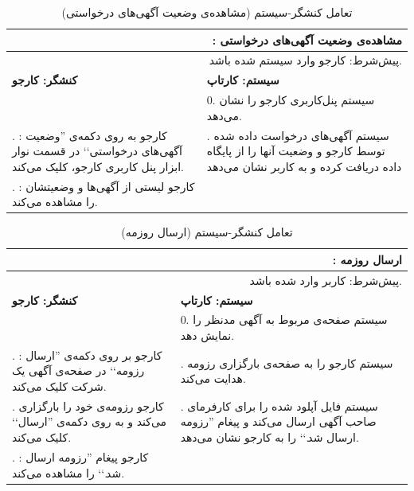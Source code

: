 \documentclass[12pt,svgnames,oneside]{book}
\newcommand{\say}[1]{‍''{#1}`‍`}
\newcommand{\uc}[1]{\lr{UC{#1}}}
\newcommand{\tucbw}{\lr{TUCBW}}
\newcommand{\tucew}{\lr{TUCEW}}
\newcommand{\actorsystem}[1]{
\textbf{کنشگر: {#1}} &
\textbf{سیستم: کارتاپ} \\
}
\newcommand{\zerostep}[1]{
& 0. {#1} \\
}
\newcounter{UseCaseCounter}
\newcommand{\step}[1]{
\stepcounter{UseCaseCounter}\arabic{UseCaseCounter}. {#1}
}
\newcommand{\ucname}[2]{
\multicolumn{2}{|r|}{\uc{{#1}}: {#2}} \\
}
\newcommand{\preif}[1]{
\multicolumn{2}{|r|}{پیش‌شرط:‌ {#1}} \\
}
\begin{document}
\setcounter{UseCaseCounter}{0}
\begin{table}[H]
\caption{تعامل کنشگر-سیستم  (مشاهده‌ی وضعیت آگهی‌های درخواستی)}
\label{table:uc:see-reqs}
\begin{center}
\begin{tabular}{|p{}|p{}|}
\hline

\ucname{18}{مشاهده‌ی وضعیت آگهی‌های درخواستی}
\hline

\preif{کارجو وارد سیستم شده باشد.}
\hline

\actorsystem{کارجو}
\hline

\zerostep{{\small سیستم پنل‌کاربری کارجو را نشان‌ می‌دهد.}}
\hline

\step{{\small\textbf{\tucbw}: کارجو به روی دکمه‌ی \say{وضعیت‌ آگهی‌های درخواستی} در قسمت نوار ابزار پنل کاربری کارجو، کلیک می‌کند.}} & 

\step{{\small سیستم آگهی‌های درخواست داده شده توسط کارجو و وضعیت‌ آنها را از پایگاه داده دریافت کرده و به کاربر نشان می‌دهد}} \\
\hline

\step{{\small\textbf{\tucew}: کارجو لیستی از آگهی‌ها و وضعیتشان را مشاهده می‌کند.}} & 
\\
\hline

\end{tabular}
\end{center}
\end{table}

\setcounter{UseCaseCounter}{0}
\begin{table}[H]
\caption{تعامل کنشگر-سیستم  (ارسال روزمه)}
\label{table:uc:send-resume}
\begin{center}
\begin{tabular}{|p{}|p{}|}
\hline

\ucname{12}{ارسال روزمه}
\hline

\preif{کاربر وارد شده باشد.}
\hline

\actorsystem{کارجو}
\hline

\zerostep{{\small سیستم صفحه‌ی مربوط به آگهی مدنظر را نمایش دهد.}}
\hline

\step{{\small \textbf{\tucbw}: کارجو بر روی دکمه‌ی \say{ارسال رزومه} در صفحه‌ی آگهی یک شرکت کلیک می‌کند.}} & 
\step{{\small سیستم کارجو را به صفحه‌ی بارگزاری رزومه هدایت می‌کند.}} \\
\hline

\step{{\small کارجو رزومه‌ی خود را بارگزاری می‌کند و به روی دکمه‌ی \say{ارسال} کلیک می‌کند.}} & \step{{\small سیستم فایل آپلود شده را برای کارفرمای صاحب آگهی ارسال می‌کند و پیغام \say{رزومه ارسال شد.} را به کارجو نشان می‌دهد.}} \\ \hline

\step{{\small \textbf{\tucew}: کارجو پیغام \say{رزومه‌ ارسال شد.} را مشاهده می‌کند.}} & 
\\
\hline

\end{tabular}
\end{center}
\end{table}
\end{document}
